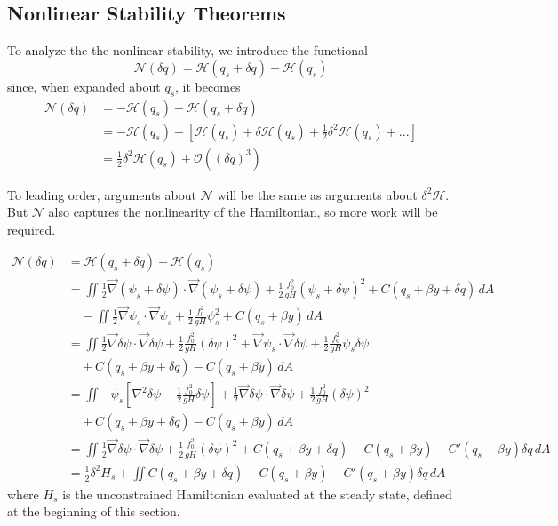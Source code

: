 \documentclass[12pt]{article}
\begin{document}
{    \subsection{Nonlinear Stability Theorems}{
        To analyze the the nonlinear stability, we introduce the functional
        $$
        \mathcal{N}(\delta q)  = \mathcal{H}(q_s + \delta q) - \mathcal{H}(q_s)
        $$
        since, when expanded about $q_s$, it becomes
        \begin{align*}
            \mathcal{N}(\delta q)
            &= - \mathcal{H}(q_s) + \mathcal{H}(q_s + \delta q) \\
            & = - \mathcal{H}(q_s) + \left[ \mathcal{H}(q_s) + \delta \mathcal{H}(q_s)+ \frac12 \delta^2 \mathcal{H}(q_s) + ... \right] \\
            &= \frac12 \delta^2 \mathcal{H}(q_s) + \mathcal{O}((\delta q)^3)
        \end{align*}

        To leading order, arguments about $\mathcal{N}$ will be the same as arguments about $\delta^2 \mathcal{H}$. But $\mathcal{N}$ also captures the nonlinearity of the Hamiltonian, so more work will be required.

        \begin{align*}
            \mathcal{N}(\delta q)
            &= \mathcal{H}(q_s + \delta q) - \mathcal{H}(q_s) \\
            &= \iint  \frac12 \vec\nabla(\psi_s + \delta \psi) \cdot \vec\nabla(\psi_s + \delta \psi) + \frac12 \frac{f_0^2}{g H} (\psi_s + \delta \psi)^2 + C(q_s + \beta y + \delta q) \, dA \\
            &\quad - \iint  \frac12 \vec\nabla\psi_s \cdot \vec\nabla\psi_s + \frac12 \frac{f_0^2}{g H} \psi_s^2 + C(q_s + \beta y) \, dA \\
            &= \iint \frac12 \vec\nabla\delta\psi \cdot \vec\nabla\delta\psi + \frac12 \frac{f_0^2}{g H} (\delta \psi)^2 + \vec\nabla\psi_s \cdot \vec\nabla\delta\psi + \frac12 \frac{f_0^2}{g H} \psi_s\delta\psi \\
            &\quad + C(q_s + \beta y + \delta q) - C(q_s + \beta y) \, dA \\
            &= \iint -\psi_s \left[ \nabla^2\delta\psi - \frac12 \frac{f_0^2}{g H} \delta\psi \right] + \frac12 \vec\nabla\delta\psi \cdot \vec\nabla\delta\psi + \frac12 \frac{f_0^2}{g H}(\delta\psi)^2 \\
            &\quad + C(q_s + \beta y + \delta q) - C(q_s + \beta y) \, dA \\
            &= \iint \frac12 \vec\nabla\delta\psi \cdot \vec\nabla\delta\psi + \frac12 \frac{f_0^2}{g H}(\delta \psi)^2 + C(q_s + \beta y + \delta q) - C(q_s + \beta y) -C'(q_s + \beta y)\delta q\, dA \\
            &= \frac12 \delta^2 H_s + \iint C(q_s + \beta y + \delta q) - C(q_s + \beta y) -C'(q_s + \beta y)\delta q\, dA
        \end{align*}
        where $H_s$ is the unconstrained Hamiltonian evaluated at the steady state, defined at the beginning of this section.
    }
}
\end{document}
